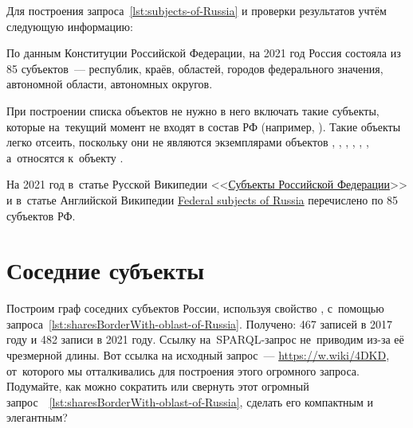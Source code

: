 Для построения запроса~\ref{lst:subjects-of-Russia} и проверки результатов учтём следующую информацию:
\begin{compactitemize}
  \item По данным Конституции Российской Федерации, на 2021 год Россия состояла из 85 субъектов~--- республик, краёв, областей, городов федерального значения, автономной области, автономных округов.
  \item При построении списка объектов не нужно в него включать такие субъекты, 
      которые на~текущий момент не входят в состав РФ (например, ). 
      Такие объекты легко отсеить, поскольку 
        они не являются экземплярами объектов , 
        , 
        , 
        , 
        , 
        , 
      а~относятся к~объекту . 
  \item На 2021 год в~статье Русской Википедии <<\href{https://ru.wikipedia.org/?curid=1042}{Субъекты Российской Федерации}>> 
        и в~статье Английской Википедии 
        \href{https://en.wikipedia.org/wiki/Federal_subjects_of_Russia}{Federal subjects of Russia} 
        перечислено по 85 субъектов РФ.
\end{compactitemize}





\section{Соседние субъекты}

Построим граф соседних субъектов России, используя свойство , 
с~помощью запроса~\ref{lst:sharesBorderWith-oblast-of-Russia}.
Получено: 467 записей в 2017 году 
и 482 записи в 2021 году. 
Ссылку на~SPARQL-запрос не~приводим из-за её чрезмерной длины. 
Вот ссылка на исходный запрос~--- \href{https://w.wiki/4DKD}
                                       {https://w.wiki/4DKD}, 
от~которого мы отталкивались для построения этого огромного запроса. 
Подумайте, как можно сократить или свернуть 
этот огромный запрос~~\ref{lst:sharesBorderWith-oblast-of-Russia}, 
сделать его компактным и элегантным?

